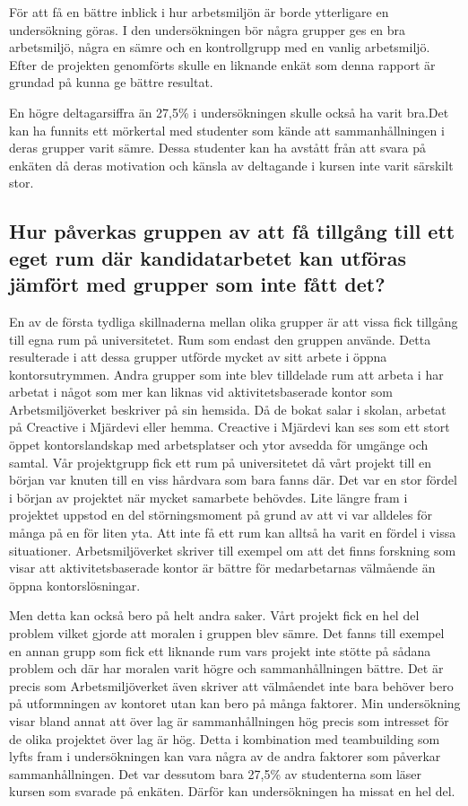 För att få en bättre inblick i hur arbetsmiljön är borde ytterligare en undersökning göras. I den undersökningen bör några grupper ges en bra arbetsmiljö, några en sämre och en kontrollgrupp med en vanlig arbetsmiljö. Efter de projekten genomförts skulle en liknande enkät som denna rapport är grundad på kunna ge bättre resultat. 

En högre deltagarsiffra än 27,5\% i undersökningen skulle också ha varit bra.Det kan ha funnits ett mörkertal med studenter som kände att sammanhållningen i deras grupper varit sämre. Dessa studenter kan ha avstått från att svara på enkäten då deras motivation och känsla av deltagande i kursen inte varit särskilt stor.

\subsection{Hur påverkas gruppen av att få tillgång till ett eget rum där kandidatarbetet kan utföras jämfört med grupper som inte fått det?}
En av de första tydliga skillnaderna mellan olika grupper är att vissa fick tillgång till egna rum på universitetet. Rum som endast den gruppen använde. Detta resulterade i att dessa grupper utförde mycket av sitt arbete i öppna kontorsutrymmen. Andra grupper som inte blev tilldelade rum att arbeta i har arbetat i något som mer kan liknas vid aktivitetsbaserade kontor som Arbetsmiljöverket beskriver på sin hemsida. Då de bokat salar i skolan, arbetat på Creactive i Mjärdevi eller hemma. Creactive i Mjärdevi kan ses som ett stort öppet kontorslandskap med arbetsplatser och ytor avsedda för umgänge och samtal. Vår projektgrupp fick ett rum på universitetet då vårt projekt till en början var knuten till en viss hårdvara som bara fanns där. Det var en stor fördel i början av projektet när mycket samarbete behövdes. Lite längre fram i projektet uppstod en del störningsmoment på grund av att vi var alldeles för många på en för liten yta. Att inte få ett rum kan alltså ha varit en fördel i vissa situationer. Arbetsmiljöverket skriver till exempel om att det finns forskning som visar att aktivitetsbaserade kontor är bättre för medarbetarnas välmående än öppna kontorslösningar. 

Men detta kan också bero på helt andra saker. Vårt projekt fick en hel del problem vilket gjorde att moralen i gruppen blev sämre. Det fanns till exempel en annan grupp som fick ett liknande rum vars projekt inte stötte på sådana problem och där har moralen varit högre och sammanhållningen bättre. Det är precis som Arbetsmiljöverket även skriver att välmåendet inte bara behöver bero på utformningen av kontoret utan kan bero på många faktorer. Min undersökning visar bland annat att över lag är sammanhållningen hög precis som intresset för de olika projektet över lag är hög. Detta i kombination med teambuilding som lyfts fram i undersökningen kan vara några av de andra faktorer som påverkar sammanhållningen. Det var dessutom bara 27,5\% av studenterna som läser kursen som svarade på enkäten. Därför kan undersökningen ha missat en hel del.


